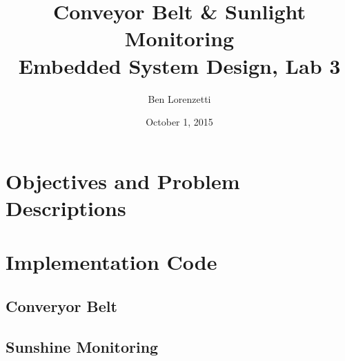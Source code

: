 \documentclass[11pt]{article}
\begin{document}
\title{Conveyor Belt \& Sunlight Monitoring\\Embedded System Design, Lab 3}
\date{October 1, 2015}
\author{Ben Lorenzetti}

\maketitle
\tableofcontents
\clearpage

\section{Objectives and Problem Descriptions}

\clearpage
\section{Implementation Code}

\subsection{Converyor Belt}
\begingroup
\fontsize{10pt}{12pt}

\endgroup

\clearpage
\subsection{Sunshine Monitoring}
\begingroup
\fontsize{10pt}{12pt}

\endgroup
\end{document}
